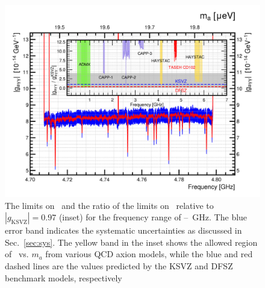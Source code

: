 \begin{figure} [htbp]
  \centering
  \includegraphics[width=12.9cm]{figures/TASEHonly_limits.png}
  \caption{The limits on \gagg\ and the ratio of the limits on 
\ggamma\ relative to $\left|g_\text{KSVZ}\right|=0.97$ 
  (inset) for the frequency range of 
\flo--\fhi~GHz. The blue error band indicates the systematic 
  uncertainties as discussed in Sec.~\ref{sec:sys}. The yellow 
 band in the inset shows the allowed region of \ggamma\ vs. $m_a$ 
 from various QCD axion models, while the blue and red dashed lines are the 
values predicted by the KSVZ and DFSZ benchmark models, respectively}
  \label{fig:glimit}
\end{figure}


